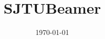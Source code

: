 \documentclass{article}
\def\themename{\textsf{SJTUBeamer}}
\begin{document}
    \title{\themename}
    \date{\today}
    \maketitle
\end{document}

